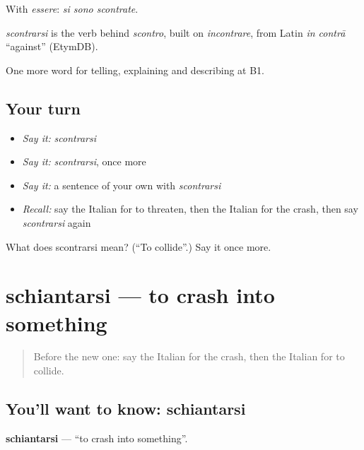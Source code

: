 With \emph{essere}: \emph{si sono scontrate}.

\begin{cousinweb}
\emph{scontrarsi} is the verb behind \emph{scontro}, built on \emph{incontrare}, from Latin \emph{in contrā} \textquotedblleft{}against\textquotedblright{} (EtymDB).
\end{cousinweb}

\begin{grammarlens}[title={What you've built}]
One more word for telling, explaining and describing at B1.
\end{grammarlens}

\subsection*{Your turn}
\begin{itemize}
\raggedright
  \item \emph{Say it:} \emph{scontrarsi}
  \item \emph{Say it:} \emph{scontrarsi}, once more
  \item \emph{Say it:} a sentence of your own with \emph{scontrarsi}
  \item \emph{Recall:} say the Italian for to threaten, then the Italian for the crash, then say \emph{scontrarsi} again
\end{itemize}

\begin{tcolorbox}[breakable,colback=teal!4,colframe=teal!35!black,title={Before you move on}]
What does scontrarsi mean? (\textquotedblleft{}To collide\textquotedblright{}.) Say it once more.
\end{tcolorbox}
\section[schiantarsi]{schiantarsi — to crash into something}

\label{lesson:IT-C299-schiantarsi}



\begin{quote}
Before the new one: say the Italian for the crash, then the Italian for to collide.
\end{quote}

\subsection*{You'll want to know: schiantarsi}
\textbf{schiantarsi} — \textquotedblleft{}to crash into something\textquotedblright{}.

